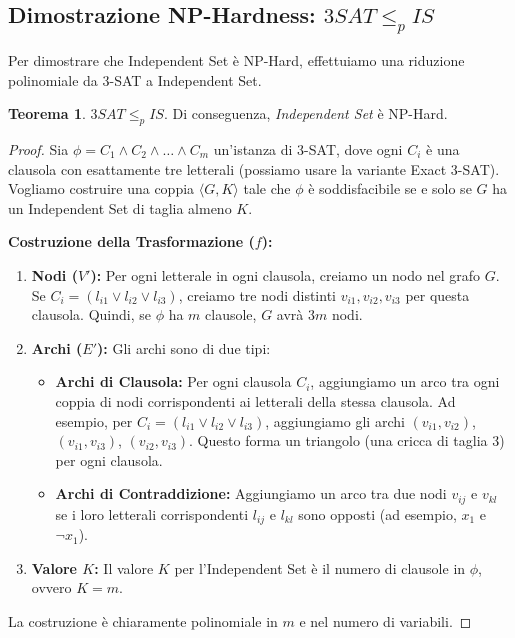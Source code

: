 \documentclass[a4paper]{article}
\theoremstyle{definition} %
\newtheorem{theorem}{Teorema}
[section]
\theoremstyle{definition} %
\begin{document}
\subsection{Dimostrazione NP-Hardness: $3SAT \le_p IS$}

Per dimostrare che Independent Set è NP-Hard, effettuiamo una riduzione polinomiale da 3-SAT a Independent Set.

\begin{theorem}
$3SAT \le_p IS$. Di conseguenza, \emph{Independent Set} è NP-Hard.
\end{theorem}

\begin{proof}
Sia $\phi = C_1 \land C_2 \land \dots \land C_m$ un'istanza di 3-SAT, dove ogni $C_i$ è una clausola con esattamente tre letterali (possiamo usare la variante Exact 3-SAT). Vogliamo costruire una coppia $\langle G, K \rangle$ tale che $\phi$ è soddisfacibile se e solo se $G$ ha un Independent Set di taglia almeno $K$.

\textbf{Costruzione della Trasformazione ($f$):}
\begin{enumerate}
    \item \textbf{Nodi ($V'$):} Per ogni letterale in ogni clausola, creiamo un nodo nel grafo $G$. Se $C_i = (l_{i1} \lor l_{i2} \lor l_{i3})$, creiamo tre nodi distinti $v_{i1}, v_{i2}, v_{i3}$ per questa clausola.
    Quindi, se $\phi$ ha $m$ clausole, $G$ avrà $3m$ nodi.
    \item \textbf{Archi ($E'$):} Gli archi sono di due tipi:
    \begin{itemize}
        \item \textbf{Archi di Clausola:} Per ogni clausola $C_i$, aggiungiamo un arco tra ogni coppia di nodi corrispondenti ai letterali della stessa clausola. Ad esempio, per $C_i = (l_{i1} \lor l_{i2} \lor l_{i3})$, aggiungiamo gli archi $(v_{i1}, v_{i2})$, $(v_{i1}, v_{i3})$, $(v_{i2}, v_{i3})$. Questo forma un triangolo (una cricca di taglia 3) per ogni clausola.
        \item \textbf{Archi di Contraddizione:} Aggiungiamo un arco tra due nodi $v_{ij}$ e $v_{kl}$ se i loro letterali corrispondenti $l_{ij}$ e $l_{kl}$ sono opposti (ad esempio, $x_1$ e $\neg x_1$).
    \end{itemize}
    \item \textbf{Valore $K$:} Il valore $K$ per l'Independent Set è il numero di clausole in $\phi$, ovvero $K=m$.
\end{enumerate}
La costruzione è chiaramente polinomiale in $m$ e nel numero di variabili.


\end{proof}
\end{document}

